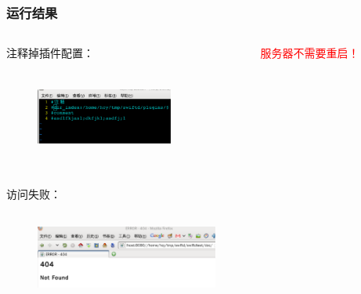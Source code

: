 \documentclass[10pt,dvipdfm]{beamer}
\begin{document}
\begin{frame}
	\frametitle{运行结果}
	\begin{columns}
		\begin{column}{0.6\textwidth}
			\begin{block}{注释掉插件配置：}
			\begin{figure}[htbp]
			\centering
			\includegraphics[height=3cm, width=4.5cm]{pics/complugin.eps}
			\end{figure}
			\end{block}
		\end{column}
		
		\begin{column}{0.3\textwidth}
			\textcolor{red}{服务器不需要重启！}
		\end{column}
	\end{columns}
	
	\begin{block}{访问失败：}
	\begin{figure}[htbp]
	\centering
	\includegraphics[height=3cm, width=6cm]{pics/nodirindex.eps}
	\end{figure}
	\end{block}
\end{frame}
\end{document}

